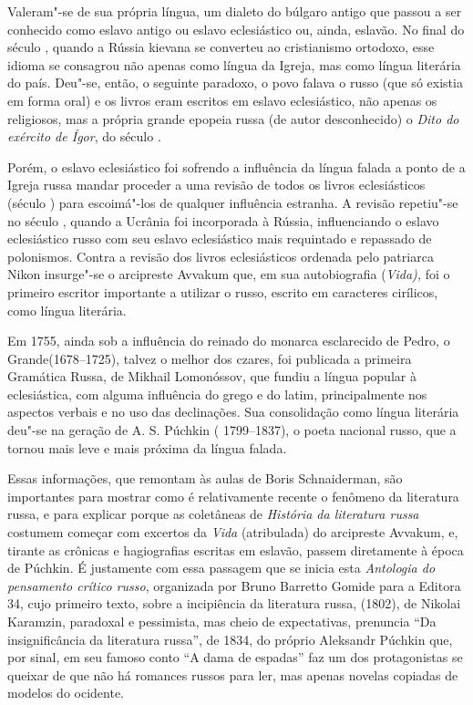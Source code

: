Valeram"-se de sua própria língua, um dialeto do búlgaro antigo que
passou a ser conhecido como eslavo antigo ou eslavo eclesiástico ou,
ainda, eslavão. No final do século , quando a Rússia kievana se
converteu ao cristianismo ortodoxo, esse idioma se consagrou não apenas
como língua da Igreja, mas como língua literária do país. Deu"-se, então,
o seguinte paradoxo, o povo falava o russo (que só existia em forma
oral) e os livros eram
escritos em eslavo eclesiástico, não apenas os religiosos, mas a própria
grande epopeia russa (de autor desconhecido) o \emph{Dito do exército de
Ígor}, do século .

Porém, o eslavo eclesiástico foi sofrendo a influência da língua falada
a ponto de a Igreja russa mandar proceder a uma revisão de todos os
livros eclesiásticos (século ) para escoimá"-los de qualquer
influência estranha. A revisão repetiu"-se no século , quando a
Ucrânia foi incorporada à Rússia, influenciando o eslavo eclesiástico
russo com seu eslavo eclesiástico mais requintado e repassado de
polonismos. Contra a revisão dos livros eclesiásticos ordenada pelo
patriarca Nikon insurge"-se o arcipreste Avvakum que, em sua
autobiografia (\emph{Vida),} foi o primeiro escritor importante a
utilizar o russo, escrito em caracteres cirílicos, como língua literária.

Em 1755, ainda sob a influência do reinado do monarca esclarecido de Pedro, o
Grande(1678--1725), talvez o melhor dos czares, foi publicada a primeira
Gramática Russa, de Mikhail Lomonóssov, que fundiu a língua popular à
eclesiástica, com alguma influência do grego e do latim,
 principalmente nos aspectos verbais e no uso das declinações. Sua
consolidação como língua literária deu"-se na geração de A. S. Púchkin (
1799--1837), o poeta nacional russo, que a tornou mais leve e mais
próxima da língua falada.

Essas informações, que remontam às aulas de Boris Schnaiderman, são
importantes para mostrar como é relativamente recente o fenômeno da
literatura russa, e para explicar porque as coletâneas de \emph{História
da literatura russa} costumem começar com excertos da \emph{Vida} (atribulada) do arcipreste Avvakum, e, tirante as crônicas e hagiografias
escritas em eslavão, passem diretamente à época de Púchkin. É
justamente com essa passagem que se inicia esta \emph{Antologia do
pensamento crítico russo}, organizada por Bruno Barretto Gomide para a Editora 34, cujo
primeiro texto, sobre a incipiência da literatura russa, (1802), de
Nikolai Karamzin, paradoxal e pessimista, mas cheio de expectativas,
prenuncia ``Da insignificância da literatura russa'', de 1834, do
próprio Aleksandr Púchkin que, por sinal, em seu famoso conto ``A dama
de espadas'' faz um dos protagonistas se queixar de que não há romances
russos para ler, mas apenas novelas copiadas de modelos do ocidente.

